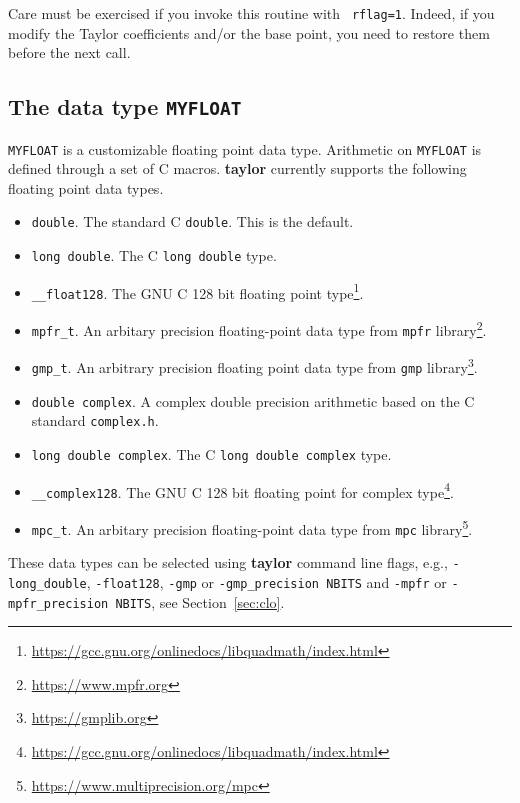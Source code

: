 \documentclass[10pt]{article}
\theoremstyle{remark}
\newcommand{\taylorname}{{\bf taylor}}
\newcommand{\myfloat}{{\tt MY\symbol{95}FLOAT}}
\begin{document}
Care must be exercised if you invoke this routine with {\tt
  rflag=1}. Indeed, if you modify the Taylor coefficients and/or the
base point, you need to restore them before the next call.


\subsection{The data type \myfloat{}} \label{sec:myfloat}

\myfloat{} is a customizable floating point data type.  Arithmetic on
\myfloat{} is defined through a set of C macros. \taylorname{}
currently supports the following floating point data types.
\begin{itemize}
    \item \verb+double+.  The standard C \verb+double+.  This is the
      default.
    \item \verb+long double+. The C \verb+long double+ type.
    \item \verb+__float128+. The GNU C 128 bit floating point
      type\footnote{\url{https://gcc.gnu.org/onlinedocs/libquadmath/index.html}}.
    \item \verb+mpfr_t+. An arbitary precision floating-point data
      type from {\tt mpfr}
      library\footnote{\url{https://www.mpfr.org}}.
    \item \verb+gmp_t+. An arbitrary precision floating point data
      type from {\tt gmp}
      library\footnote{\url{https://gmplib.org}}.
    \item \verb+double complex+. A complex double precision arithmetic
      based on the C standard \verb+complex.h+.
    \item \verb+long double complex+. The C \verb+long double complex+ type.
    \item \verb+__complex128+. The GNU C 128 bit floating point for
      complex
      type\footnote{\url{https://gcc.gnu.org/onlinedocs/libquadmath/index.html}}.
    \item \verb+mpc_t+. An arbitary precision floating-point data type
      from {\tt mpc}
      library\footnote{\url{https://www.multiprecision.org/mpc}}.
\end{itemize}
These data types can be selected using \taylorname{} command line
flags, e.g., \verb+-long_double+, \verb+-float128+, \verb+-gmp+ or
\verb+-gmp_precision NBITS+ and \verb+-mpfr+ or
\verb+-mpfr_precision NBITS+, see Section~\ref{sec:clo}.

\medskip 
\end{document}
